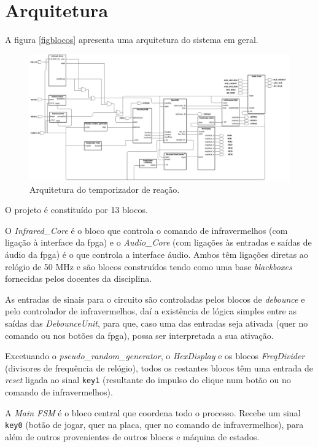 \documentclass[a4paper,11pt,onecolumn]{report}
\begin{document}
\section{Arquitetura}
A figura \autoref{figblocos} apresenta uma arquitetura do sistema em geral.

\begin{figure}[h]
\centerline{\includegraphics[scale=0.25]{Images/BlockDiagram}}
\caption{Arquitetura do temporizador de reação.}
\label{figblocos}
\end{figure}

O projeto é constituído por 13 blocos.

O \textit{Infrared\_Core} é o bloco que controla o comando de infravermelhos (com ligação à interface da \ac{fpga}) e o \textit{Audio\_Core} (com ligações às entradas e saídas de áudio da \ac{fpga}) é o que controla a interface áudio. Ambos têm ligações diretas ao relógio de 50 MHz e são blocos construídos tendo como uma base \textit{blackboxes} fornecidas pelos docentes da disciplina.

As entradas de sinais para o circuito são controladas pelos blocos de \textit{debounce} e pelo controlador de infravermelhos, daí a existência de lógica simples entre as saídas das \textit{DebounceUnit}, para que, caso uma das entradas seja ativada (quer no comando ou nos botões da \ac{fpga}), possa ser interpretada a sua ativação.

Excetuando o \textit{pseudo\_random\_generator}, o \textit{HexDisplay} e os blocos \textit{FreqDivider} (divisores de frequência de relógio), todos os restantes blocos têm uma entrada de \textit{reset} ligada ao sinal \texttt{key1} (resultante do impulso do clique num botão ou no comando de infravermelhos).

A \textit{Main FSM} é o bloco central que coordena todo o processo. Recebe um sinal \texttt{key0} (botão de jogar, quer na placa, quer no comando de infravermelhos), para além de outros provenientes de outros blocos e máquina de estados. 
\end{document}
